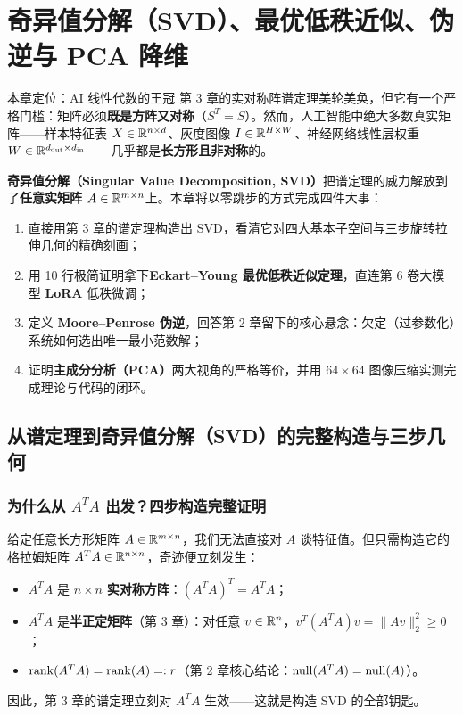 \chapter[奇异值分解、伪逆与 PCA 降维]{奇异值分解（SVD）、最优低秩近似、伪逆与 PCA 降维}
\label{ch:ch4}


\begin{chapIntro}{本章定位：AI 线性代数的王冠}
第 3 章的实对称阵谱定理美轮美奂，但它有一个严格门槛：矩阵必须\textbf{既是方阵又对称}（$S^T = S$）。然而，人工智能中绝大多数真实矩阵——样本特征表 $X \in \mathbb{R}^{n\times d}$、灰度图像 $I \in \mathbb{R}^{H\times W}$、神经网络线性层权重 $W \in \mathbb{R}^{d_{\mathrm{out}}\times d_{\mathrm{in}}}$——几乎都是\textbf{长方形且非对称}的。

\textbf{奇异值分解（Singular Value Decomposition, SVD）}把谱定理的威力解放到了\textbf{任意实矩阵 $A \in \mathbb{R}^{m\times n}$}上。本章将以零跳步的方式完成四件大事：
\begin{enumerate}
  \item 直接用第 3 章的谱定理构造出 SVD，看清它对四大基本子空间与三步旋转拉伸几何的精确刻画；
  \item 用 10 行极简证明拿下\textbf{Eckart--Young 最优低秩近似定理}，直连第 6 卷大模型 \textbf{LoRA} 低秩微调；
  \item 定义 \textbf{Moore--Penrose 伪逆}，回答第 2 章留下的核心悬念：欠定（过参数化）系统如何选出唯一最小范数解；
  \item 证明\textbf{主成分分析（PCA）}两大视角的严格等价，并用 $64\times 64$ 图像压缩实测完成理论与代码的闭环。
\end{enumerate}
\end{chapIntro}

\section{从谱定理到奇异值分解（SVD）的完整构造与三步几何}
\label{sec:ch4-svd-construction}

\subsection{为什么从 $A^T A$ 出发？四步构造完整证明}

给定任意长方形矩阵 $A \in \mathbb{R}^{m\times n}$，我们无法直接对 $A$ 谈特征值。但只需构造它的格拉姆矩阵 $A^T A \in \mathbb{R}^{n\times n}$，奇迹便立刻发生：
\begin{itemize}
  \item $A^T A$ 是 $n\times n$ \textbf{实对称方阵}：$(A^T A)^T = A^T A$；
  \item $A^T A$ 是\textbf{半正定矩阵}（第 3 章）：对任意 $v \in \mathbb{R}^n$，$v^T (A^T A) v = \|Av\|_2^2 \ge 0$；
  \item $\operatorname{rank}(A^T A) = \operatorname{rank}(A) =: r$（第 2 章核心结论：$\operatorname{null}(A^T A) = \operatorname{null}(A)$）。
\end{itemize}
因此，第 3 章的谱定理立刻对 $A^T A$ 生效——这就是构造 SVD 的全部钥匙。

